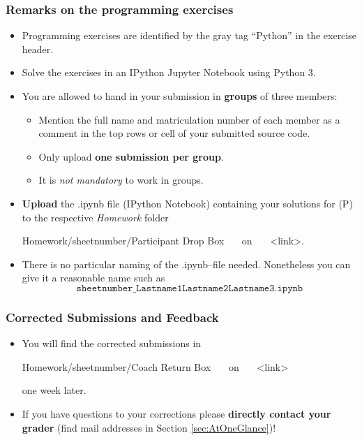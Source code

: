 \documentclass{article}
\def\exerciseUploadRep{<link>}
\begin{document}
\subsubsection{Remarks on the programming exercises} 
\begin{itemize}
	\item Programming exercises are identified by the gray tag ``Python'' in the exercise header.
	\item Solve the exercises in an IPython Jupyter Notebook using Python 3.
	\item You are allowed to hand in your submission in \textbf{groups} of three members:
	\begin{itemize}
		\item Mention the full name and matriculation number of each member as a comment in the top rows or cell of your submitted source code.
		\item Only upload \textbf{one submission per group}.
		\item It is \textit{not mandatory} to work in groups.
	\end{itemize} 
	\item \textbf{Upload} the .ipynb file (IPython Notebook) containing your solutions for (P) to the respective \textit{Homework} folder \\%
	\begin{center}
		Homework/sheetnumber/Participant Drop Box ~~~on~~~ \exerciseUploadRep.
	\end{center}
	 \item There is no particular naming of the .ipynb--file needed. Nonetheless you can give it a reasonable name such as $$\texttt{sheetnumber\_Lastname1Lastname2Lastname3.ipynb}$$
\end{itemize}
\subsubsection{Corrected Submissions and Feedback} 
\begin{itemize}
	\item You will find the corrected submissions in 
		\begin{center}
		Homework/sheetnumber/Coach Return Box ~~~on~~~ \exerciseUploadRep
	\end{center}
	one week later.
	\item If you have questions to your corrections please \textbf{directly contact your grader} (find mail addresses in Section \ref{sec:AtOneGlance})!
\end{itemize}
\end{document}
